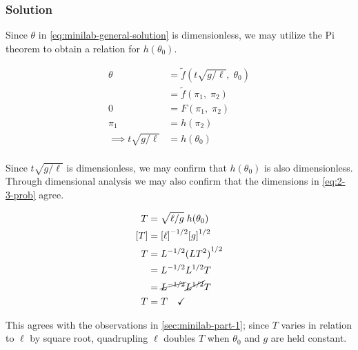 \documentclass[12pt]{article}
\begin{document}
  \subsubsection*{Solution}

  Since $\theta$ in \cref{eq:minilab-general-solution} is dimensionless, we may
  utilize the Pi theorem to obtain a relation for $h(\theta_0)$.

  \begin{equation}
    \begin{aligned}
      \theta &= \tilde{f}(t\sqrt{g/\ell},\;\theta_0) \\
      &= \tilde{f}(\pi_1,\;\pi_2) \\
      0 &= F(\pi_1,\;\pi_2) \\
      \pi_1 &= h(\pi_2) \\
      \implies t\sqrt{g/\ell} &= h(\theta_0) \\
    \end{aligned}
  \end{equation}

  Since $t\sqrt{g/\ell}$ is dimensionless, we may confirm that $h(\theta_0)$ is
  also dimensionless. Through dimensional analysis we may also confirm that the
  dimensions in \cref{eq:2-3-prob} agree.

  \begin{equation}
    \begin{aligned}
      T &= \sqrt{\ell/g}\;h(\theta_0) \\
      [T] &= {[\ell]}^{-1/2}{[g]}^{1/2} \\
      T &= L^{-1/2}{(LT^2)}^{1/2} \\
      &= L^{-1/2}L^{1/2}T \\
      &= \cancel{L^{-1/2}}\cancel{L^{1/2}}T \\
      T &= T \quad\checkmark
    \end{aligned}
  \end{equation}

  This agrees with the observations in \cref{sec:minilab-part-1}; since $T$
  varies in relation to $\ell$ by square root, quadrupling $\ell$ doubles $T$
  when $\theta_0$ and $g$ are held constant.
\end{document}

